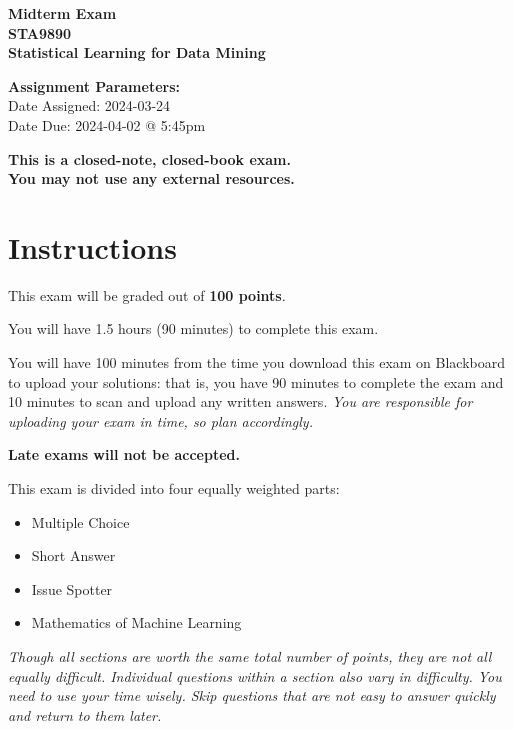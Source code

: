 \documentclass[12pt]{article}
\begin{document}
\begin{center}
    {\Large \bf Midterm Exam \\ STA9890 \\ Statistical Learning for Data Mining}
\end{center}

{\bf Assignment Parameters:} \\
\phantom{abc}Date Assigned: 2024-03-24\\
\phantom{abc}Date Due: 2024-04-02 @ 5:45pm \\

\begin{center}
    \bf \large This is a closed-note, closed-book exam.\\You may not use any external resources.
\end{center}

\section*{Instructions}
This exam will be graded out of \textbf{100 points}. 

You will have 1.5 hours (90 minutes) to complete this exam. 

You will have 100 minutes from the time you download this exam on Blackboard to upload your solutions: that is, you have 90 minutes to complete the exam and 10 minutes to scan and upload any written answers. \emph{You are responsible for uploading your exam in time, so plan accordingly.}

\begin{center} \large \textbf{Late exams will not be accepted.} \end{center}



This exam is divided into four equally weighted parts: 
\begin{itemize}
    \item Multiple Choice
    \item Short Answer
    \item Issue Spotter
    \item Mathematics of Machine Learning
\end{itemize}

\emph{Though all sections are worth the same total number of points, they are not all equally difficult. Individual questions within a section also vary in difficulty. You need to use your time wisely. Skip questions that are not easy to answer quickly and return to them later.}
\end{document}

